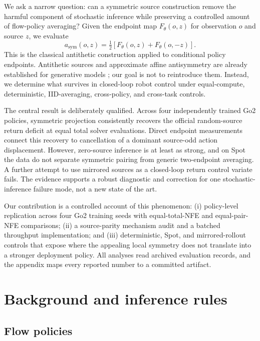 \documentclass{article}
\begin{document}
We ask a narrow question: can a symmetric source construction remove the
harmful component of stochastic inference while preserving a controlled amount
of flow-policy averaging? Given the endpoint map $F_\theta(o,z)$ for observation
$o$ and source $z$, we evaluate
\begin{equation}
  a_{\mathrm{sym}}(o,z)
  = \tfrac{1}{2}\left[F_\theta(o,z)+F_\theta(o,-z)\right].
  \label{eq:symmetric}
\end{equation}
This is the classical antithetic construction applied to conditional policy
endpoints. Antithetic sources and approximate affine antisymmetry are already
established for generative models \citep{jia2025antithetic}; our goal is not to
reintroduce them. Instead, we determine what survives in closed-loop robot
control under equal-compute, deterministic, IID-averaging, cross-policy, and
cross-task controls.

The central result is deliberately qualified. Across four independently
trained Go2 policies, symmetric projection consistently recovers the official
random-source return deficit at equal total solver evaluations. Direct endpoint
measurements connect this recovery to cancellation of a dominant source-odd
action displacement. However, zero-source inference is at least as strong, and
on Spot the data do not separate symmetric pairing from generic two-endpoint
averaging. A further attempt to use mirrored sources as a closed-loop return
control variate fails. The evidence supports a robust diagnostic and correction
for one stochastic-inference failure mode, not a new state of the art.

Our contribution is a controlled account of this phenomenon: (i) policy-level
replication across four Go2 training seeds with equal-total-NFE and equal-pair-NFE
comparisons; (ii) a source-parity mechanism audit and a batched throughput
implementation; and (iii) deterministic, Spot, and mirrored-rollout controls
that expose where the appealing local symmetry does not translate into a
stronger deployment policy. All analyses read archived evaluation records, and
the appendix maps every reported number to a committed artifact.

\section{Background and inference rules}

\subsection{Flow policies}
\end{document}
